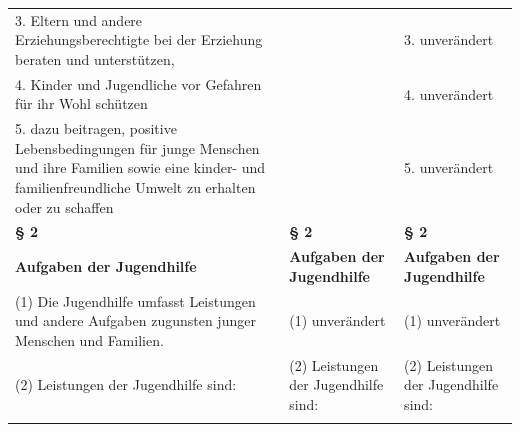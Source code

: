 \documentclass[10pt,a4paper,landscape]{article}
\begin{document}
\begin{longtable}{|L{8.2cm}|L{8.2cm}|L{8.2cm}|}
\hhline{|---|}
3. Eltern und andere Erziehungsberechtigte  \newline bei der Erziehung beraten und  \newline unterstützen, &  & 3. unverändert \\
\hhline{|---|}
4. Kinder und Jugendliche vor Gefahren für  \newline ihr Wohl schützen &  & 4. unverändert \\
\hhline{|---|}
5. dazu beitragen, positive  \newline Lebensbedingungen für junge Menschen  \newline und ihre Familien sowie eine kinder- und  \newline familienfreundliche Umwelt zu erhalten  \newline oder zu schaffen &  & 5. unverändert \\
\hhline{|---|}
\textbf{\S{} 2} & \textbf{\S{} 2} & \textbf{\S{} 2} \\
\hhline{|---|}
\textbf{Aufgaben der Jugendhilfe} & \textbf{Aufgaben der Jugendhilfe} & \textbf{Aufgaben der Jugendhilfe} \\
\hhline{|---|}
(1) Die Jugendhilfe umfasst Leistungen und  \newline andere Aufgaben zugunsten junger  \newline Menschen und Familien. & (1) unverändert & (1) unverändert \\
\hhline{|---|}
(2) Leistungen der Jugendhilfe sind: & (2) Leistungen der Jugendhilfe sind: & (2) Leistungen der Jugendhilfe sind: \\
\hhline{|---|}

\end{longtable}
\end{document}
